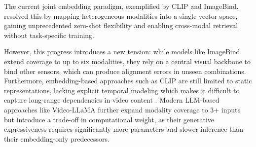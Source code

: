 \documentclass[12pt,a4paper,oneside,english]{book}
\begin{document}
The current joint embedding paradigm, exemplified by CLIP and ImageBind, resolved this by mapping heterogeneous modalities into a single vector space, gaining unprecedented zero-shot flexibility
and enabling cross-modal retrieval without task-specific training.

However, this progress introduces a new tension: while models like ImageBind extend coverage to up to six modalities, they rely on a central visual backbone to bind other sensors, which can produce alignment errors in unseen combinations.
Furthermore, embedding-based approaches such as CLIP are still limited to static representations, lacking explicit temporal modeling which makes it difficult to capture long-range dependencies in video content . Modern LLM-based approaches like Video-LLaMA further expand modality coverage to 3+ inputs but introduce a trade-off in computational weight, as their generative expressiveness requires significantly more parameters and slower inference than their embedding-only predecessors.

\vspace{0.5cm}
\end{document}
